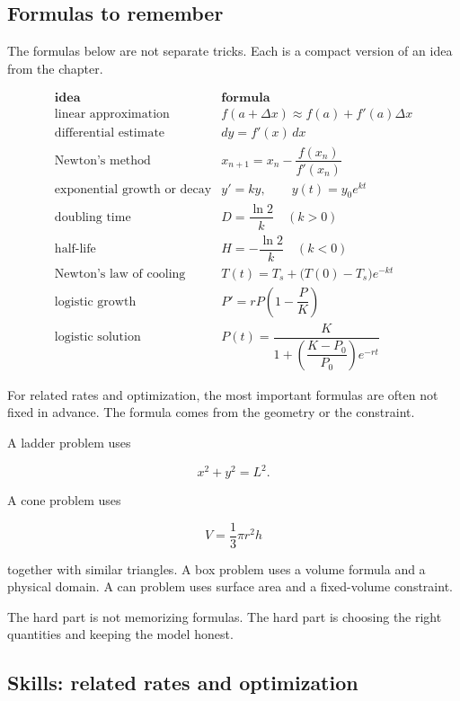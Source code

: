 \subsection{Formulas to remember}
\label{subsec:chapter7-formulas}

The formulas below are not separate tricks.  Each is a compact version of an idea from
the chapter.

\[
\begin{array}{c|c}
\textbf{idea} & \textbf{formula} \\ \hline
\text{linear approximation} &
f(a+\Delta x)\approx f(a)+f'(a)\Delta x \\[6pt]
\text{differential estimate} &
dy=f'(x)\,dx \\[6pt]
\text{Newton's method} &
x_{n+1}=x_n-\dfrac{f(x_n)}{f'(x_n)} \\[12pt]
\text{exponential growth or decay} &
y'=ky,\qquad y(t)=y_0e^{kt} \\[8pt]
\text{doubling time} &
D=\dfrac{\ln2}{k}\quad(k>0) \\[10pt]
\text{half-life} &
H=-\dfrac{\ln2}{k}\quad(k<0) \\[10pt]
\text{Newton's law of cooling} &
T(t)=T_s+\bigl(T(0)-T_s\bigr)e^{-kt} \\[8pt]
\text{logistic growth} &
P'=rP\left(1-\dfrac{P}{K}\right) \\[12pt]
\text{logistic solution} &
P(t)=\dfrac{K}{1+\left(\dfrac{K-P_0}{P_0}\right)e^{-rt}}
\end{array}
\]

For related rates and optimization, the most important formulas are often not fixed in
advance.  The formula comes from the geometry or the constraint.

A ladder problem uses

\[
x^2+y^2=L^2.
\]

A cone problem uses

\[
V=\frac13\pi r^2h
\]

together with similar triangles.  A box problem uses a volume formula and a physical
domain.  A can problem uses surface area and a fixed-volume constraint.

The hard part is not memorizing formulas.  The hard part is choosing the right
quantities and keeping the model honest.

\subsection{Skills: related rates and optimization}
\label{subsec:skills-related-rates-optimization}

